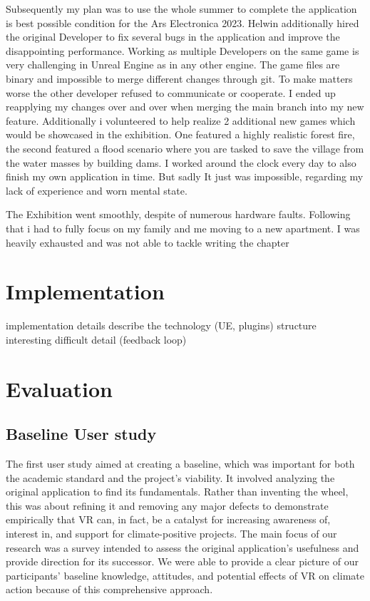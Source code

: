 \documentclass[draft, final]{vutinfth} %
\begin{document}
Subsequently my plan was to use the whole summer to complete the application is best possible condition for the Ars Electronica 2023. Helwin additionally hired the original Developer to fix several bugs in the application and improve the disappointing performance. Working as multiple Developers on the same game is very challenging in Unreal Engine as in any other engine. The game files are binary and impossible to merge different changes through git. To make matters worse the other developer refused to communicate or cooperate. I ended up reapplying my changes over and over when merging the main branch into my new feature. Additionally i volunteered to help realize 2 additional new games which would be showcased in the exhibition. One featured a highly realistic forest fire, the second featured a flood scenario where you are tasked to save the village from the water masses by building dams. I worked around the clock every day to also finish my own application in time. But sadly It just was impossible, regarding my lack of experience and worn mental state.

The Exhibition went smoothly, despite of numerous hardware faults. Following that i had to fully focus on my family and me moving to a new apartment. I was heavily exhausted and was not able to tackle writing the chapter 


\chapter{Implementation}

implementation details
describe the technology (UE, plugins)
structure
interesting difficult detail (feedback loop)

\chapter{Evaluation}
\section{Baseline User study}
The first user study aimed at creating a baseline, which was important for both the academic standard and the project's viability. It involved analyzing the original application to find its fundamentals. Rather than inventing the wheel, this was about refining it and removing any major defects to demonstrate empirically that VR can, in fact, be a catalyst for increasing awareness of, interest in, and support for climate-positive projects. The main focus of our research was a survey intended to assess the original application's usefulness and provide direction for its successor. We were able to provide a clear picture of our participants' baseline knowledge, attitudes, and potential effects of VR on climate action because of this comprehensive approach.
\end{document}
